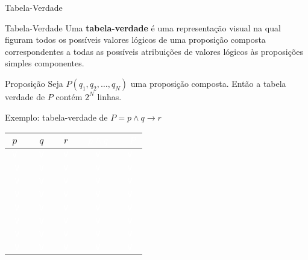 \begin{frame}[fragile]{Tabela-Verdade}
    \begin{block}{Tabela-Verdade}
        Uma \textbf{tabela-verdade} é uma representação visual na qual figuram todos os possíveis
        valores lógicos de uma proposição composta correspondentes a todas as possíveis atribuições
        de valores lógicos às proposições simples componentes.
    \end{block}

    \vspace{0.2in}

    \begin{block}{Proposição}
        Seja $P(q_1, q_2, \ldots, q_N)$ uma proposição composta. Então a tabela verdade de $P$ contém
        $2^N$ linhas.
    \end{block}

\end{frame}

\begin{frame}[fragile]{Exemplo: tabela-verdade de $P = p \land q \to r$}

    \begin{table}
        \centering
        \begin{tabular}{>{\tt}c>{\tt}c>{\tt}c>{\tt}c>{\tt}c}
            \hline
            $p$ & $q$ & $r$ & \textcolor{white}{$p\land q$} & \textcolor{white}{$P$}\\
            \hline
            \textcolor{white}{V} & \textcolor{white}{V} & \textcolor{white}{V} & \textcolor{white}{V} & \textcolor{white}{V} \\
            \hline
            \textcolor{white}{V} & \textcolor{white}{V} & \textcolor{white}{V} & \textcolor{white}{V} & \textcolor{white}{V} \\
            \hline
            \textcolor{white}{V} & \textcolor{white}{V} & \textcolor{white}{V} & \textcolor{white}{V} & \textcolor{white}{V} \\
            \hline
            \textcolor{white}{V} & \textcolor{white}{V} & \textcolor{white}{V} & \textcolor{white}{V} & \textcolor{white}{V} \\
            \hline
            \textcolor{white}{V} & \textcolor{white}{V} & \textcolor{white}{V} & \textcolor{white}{V} & \textcolor{white}{V} \\
            \hline
            \textcolor{white}{V} & \textcolor{white}{V} & \textcolor{white}{V} & \textcolor{white}{V} & \textcolor{white}{V} \\
            \hline
            \textcolor{white}{V} & \textcolor{white}{V} & \textcolor{white}{V} & \textcolor{white}{V} & \textcolor{white}{V} \\
            \hline
            \textcolor{white}{V} & \textcolor{white}{V} & \textcolor{white}{V} & \textcolor{white}{V} & \textcolor{white}{V} \\
            \hline
        \end{tabular}
    \end{table}
\end{frame}

